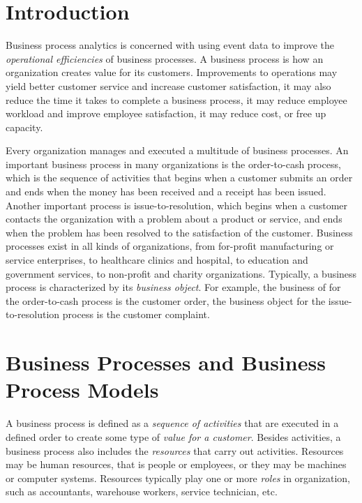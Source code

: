 %
%

\section{Introduction}

Business process analytics is concerned with using event data to improve the \emph{operational efficiencies} of business processes. A business process is how an organization creates value for its customers. Improvements to operations may yield better customer service and increase customer satisfaction, it may also reduce the time it takes to complete a business process, it may reduce employee workload and improve employee satisfaction, it may reduce cost, or free up capacity. 

Every organization manages and executed a multitude of business processes. An important business process in many organizations is the order-to-cash process, which is the sequence of activities that begins when a customer submits an order and ends when the money has been received and a receipt has been issued. Another important process is issue-to-resolution, which begins when a customer contacts the organization with a problem about a product or service, and ends when the problem has been resolved to the satisfaction of the customer. Business processes exist in all kinds of organizations, from for-profit manufacturing or service enterprises, to healthcare clinics and hospital, to education and government services, to non-profit and charity organizations. Typically, a business process is characterized by its \emph{business object}. For example, the business of for the order-to-cash process is the customer order, the business object for the issue-to-resolution process is the customer complaint.

\section{Business Processes and Business Process Models}

A business process is defined as a \emph{sequence of activities} that are executed in a defined order to create some type of \emph{value for a customer}. Besides activities, a business process also includes the \emph{resources} that carry out activities. Resources may be human resources, that is people or employees, or they may be machines or computer systems. Resources typically play one or more \emph{roles} in organization, such as accountants, warehouse workers, service technician, etc.

